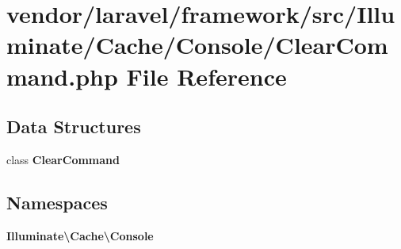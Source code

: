 \section{vendor/laravel/framework/src/\+Illuminate/\+Cache/\+Console/\+Clear\+Command.php File Reference}
\label{laravel_2framework_2src_2_illuminate_2_cache_2_console_2_clear_command_8php}
\subsection*{Data Structures}
\begin{DoxyCompactItemize}
\item 
class {\bf Clear\+Command}
\end{DoxyCompactItemize}
\subsection*{Namespaces}
\begin{DoxyCompactItemize}
\item 
 {\bf Illuminate\textbackslash{}\+Cache\textbackslash{}\+Console}
\end{DoxyCompactItemize}

